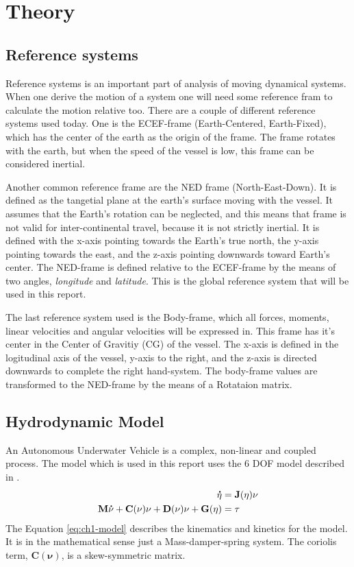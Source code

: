 \chapter{Theory}
	
\section{Reference systems}
	Reference systems is an important part of analysis of moving dynamical systems. When one derive the motion of 
	a system one will need some reference fram to calculate the motion relative too. There are a couple of different 
	reference systems used today. One is the ECEF-frame (Earth-Centered, Earth-Fixed), which has the center of the 
	earth as the origin of the frame. The frame rotates with the earth, but when the speed of the vessel is low, 
	this frame can be considered inertial. \cite{forsell}
	
	Another common reference frame are the NED frame (North-East-Down). It is defined as the tangetial plane at 
	the earth's surface moving with the vessel. It assumes that the Earth's rotation can be neglected, and this means 
	that frame is not valid for inter-continental travel, because it is not strictly inertial. It is defined with 
	the x-axis pointing towards the Earth's true north, the y-axis pointing towards the east, and the z-axis 
	pointing downwards toward Earth's center. The NED-frame is defined relative to the ECEF-frame by the means of 
	two angles, \textit{longitude} and \textit{latitude}. This is the global reference system that will be used 
	in this report. \cite{fossen}
	
	The last reference system used is the Body-frame, which all forces, moments, linear velocities and angular 
	velocities will be expressed in. This frame has it's center in the Center of Gravitiy (CG) of the vessel. The 
	x-axis is defined in the logitudinal axis of the vessel, y-axis to the right, and the z-axis is directed 
	downwards to complete the right hand-system. The body-frame values are transformed to the NED-frame by the means 
	of a Rotataion matrix.
	
	
	

\section{Hydrodynamic Model}
	\label{sec:ch1-model}
	An Autonomous Underwater Vehicle is a complex, non-linear and coupled process. The model which is used in this
	report uses the 6 DOF model described in \cite{fossen}.
	\begin{equation}
	\label{eq:ch1-model}
		\begin{aligned}
			\mathbf{\dot{\eta}} &= \mathbf{J}(\mathbf{\eta}) \mathbf{\nu} \\
			\mathbf{M}\mathbf{\dot{\nu}} + \mathbf{C}(\mathbf{\nu})\mathbf{\nu} + \mathbf{D}(\mathbf{\nu})\mathbf{\nu} + \mathbf{G}(\mathbf{\eta}) &= \mathbf{\tau} \\
		\end{aligned}
	\end{equation}
	The Equation \eqref{eq:ch1-model} describes the kinematics and kinetics for the model. It is in the 
	mathematical sense just a Mass-damper-spring system. The coriolis term, $\mathbf{C}(\mathbf{\nu})$, is 
	a skew-symmetric matrix.
	
